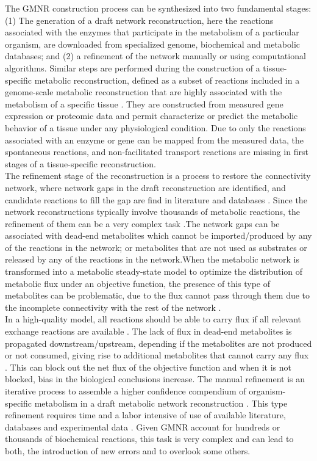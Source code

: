 The GMNR construction process can be synthesized into two fundamental stages: (1) The generation of a draft network reconstruction, here the reactions associated with the enzymes that participate in the metabolism of a particular organism, are downloaded from specialized genome, biochemical and metabolic databases; and (2) a  refinement of the network manually or using computational algorithms. Similar steps are performed during the construction of a tissue-specific metabolic reconstruction, defined as a subset of reactions included in a genome-scale metabolic reconstruction that are highly associated with  the metabolism of a specific tissue  \cite{Palsson2009}. They are constructed from measured gene expression or proteomic data and permit characterize or predict the metabolic behavior of a tissue under any physiological condition. Due to only the reactions associated with an enzyme or gene can be mapped from the measured data, the spontaneous reactions, and non-facilitated transport reactions are missing in first stages of a tissue-specific reconstruction.\\

The refinement stage of the reconstruction is a process to restore the connectivity network, where network gaps in the draft reconstruction are identified, and candidate reactions to fill the gap are find in literature and databases \cite{Thiele2010, kumar2007optimization}. Since the network reconstructions typically involve thousands of metabolic reactions, the refinement of them can be a very complex task \cite{agren2013raven}.The network gaps can be associated with dead-end metabolites which cannot be imported/produced by any of the reactions in the network; or metabolites that are not used as substrates or released by any of the reactions in the network.When the metabolic network is transformed into a metabolic steady-state model to optimize the distribution of metabolic flux under an objective function, the presence of this type of metabolites can be problematic, due to the flux cannot pass through them due to the incomplete connectivity with the rest of the network \cite{kumar2007optimization}.\\

In a high-quality model, all reactions should be able to carry flux if all relevant exchange reactions are available \cite{agren2013raven}. The lack of flux in dead-end metabolites is propagated downstream/upstream, depending if the metabolites are not produced or not consumed, giving rise to additional metabolites that cannot carry any flux  \cite{kumar2007optimization}. This can block out the net flux of the objective function and when it is not blocked, bias in the biological conclusions increase. The manual refinement is an iterative process to assemble a higher confidence compendium of organism-specific metabolism in a draft metabolic network reconstruction \cite{howe2008big,bateman2010curators,heavner2015transparency}. This type refinement requires time and a labor intensive of use of available literature, databases and experimental data \cite{heavner2015transparency, lakshmanan2012software}. Given GMNR account for hundreds or thousands of biochemical reactions, this task is very complex and can lead to both, the introduction of new errors and to overlook some others.

